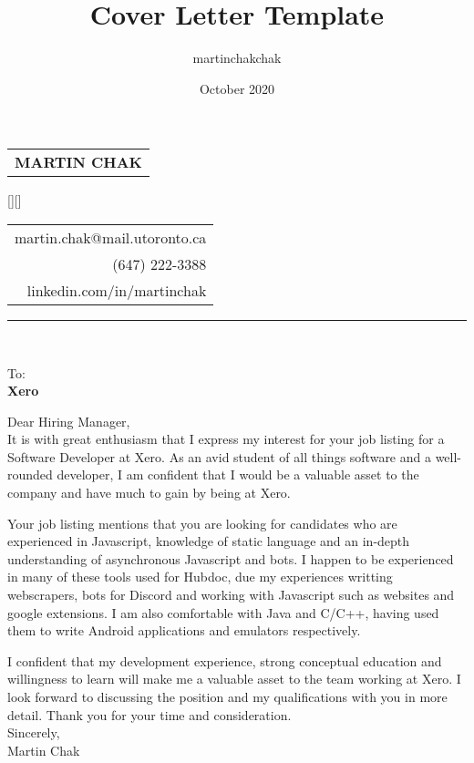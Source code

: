 \documentclass[12pt,letterpaper]{article}
\title{Cover Letter Template}
\author{martinchakchak }
\date{October 2020}
\begin{document}
\noindent
\begin{spacing}{1.125}
    \vfill\noindent
    \begin{tabular}[t]{@{}l} 
      \MakeUppercase{\fontsize{18pt}{5pt}\bf Martin Chak}
    \end{tabular}
    \hfill
    \hspace*{7.5cm}
    \raisebox{0.15cm}[\height][\depth]{
        \begin{tabular}[t]{r}
            martin.chak@mail.utoronto.ca\\
            (647) 222-3388\\
            linkedin.com/in/martinchak
        \end{tabular}
    }
\end{spacing}

\hrule



\noindent\\

\noindent
{\fontsize{10pt}{5pt}To:}\\
{\bf Xero}\\

\begin{text}
    Dear Hiring Manager,\\
    
    It is with great enthusiasm that I express my interest for your job listing for a Software Developer at Xero. As an avid student of all things software and a well-rounded developer, I am  confident that I would be a valuable asset to the company and have much to gain by being at Xero.
    
    Your job listing mentions that you are looking for candidates who are experienced in Javascript, knowledge of static language and an in-depth understanding of asynchronous Javascript and bots. I happen to be experienced in many of these tools used for Hubdoc, due my experiences writting webscrapers, bots for Discord and working with Javascript such as websites and google extensions. I am also comfortable with Java and C/C++, having used them to write Android applications and emulators respectively.
    
    I confident that my development experience, strong conceptual education and willingness to learn will make me a valuable asset to the team working at Xero. I look forward to discussing the position and my qualifications with you in more detail. Thank you for your time and consideration.\\
    
    Sincerely,\\
    Martin Chak
\end{text}
\end{document}
